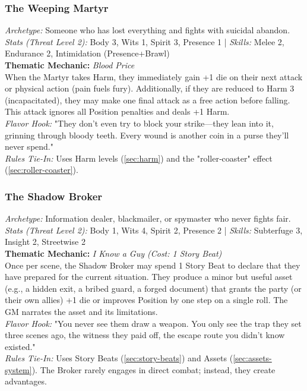 \subsubsection{The Weeping Martyr}
\textit{Archetype:} Someone who has lost everything and fights with suicidal abandon.\\
\textit{Stats (Threat Level 2):} Body 3, Wits 1, Spirit 3, Presence 1 \quad | \quad \textit{Skills:} Melee 2, Endurance 2, Intimidation (Presence+Brawl)\\
\textbf{Thematic Mechanic:} \textit{Blood Price} \\
When the Martyr takes Harm, they immediately gain +1 die on their next attack or physical action (pain fuels fury). Additionally, if they are reduced to Harm 3 (incapacitated), they may make one final attack as a free action before falling. This attack ignores all Position penalties and deals +1 Harm.\\
\textit{Flavor Hook:} "They don't even try to block your strike---they lean into it, grinning through bloody teeth. Every wound is another coin in a purse they'll never spend."\\
\textit{Rules Tie-In:} Uses Harm levels (\autoref{sec:harm}) and the "roller‑coaster" effect (\autoref{sec:roller-coaster}).

\subsubsection{The Shadow Broker}
\textit{Archetype:} Information dealer, blackmailer, or spymaster who never fights fair.\\
\textit{Stats (Threat Level 2):} Body 1, Wits 4, Spirit 2, Presence 2 \quad | \quad \textit{Skills:} Subterfuge 3, Insight 2, Streetwise 2\\
\textbf{Thematic Mechanic:} \textit{I Know a Guy (Cost: 1 Story Beat)} \\
Once per scene, the Shadow Broker may spend 1 Story Beat to declare that they have prepared for the current situation. They produce a minor but useful asset (e.g., a hidden exit, a bribed guard, a forged document) that grants the party (or their own allies) +1 die or improves Position by one step on a single roll. The GM narrates the asset and its limitations.\\
\textit{Flavor Hook:} "You never see them draw a weapon. You only see the trap they set three scenes ago, the witness they paid off, the escape route you didn't know existed."\\
\textit{Rules Tie-In:} Uses Story Beats (\autoref{sec:story-beats}) and Assets (\autoref{sec:assets-system}). The Broker rarely engages in direct combat; instead, they create advantages.

